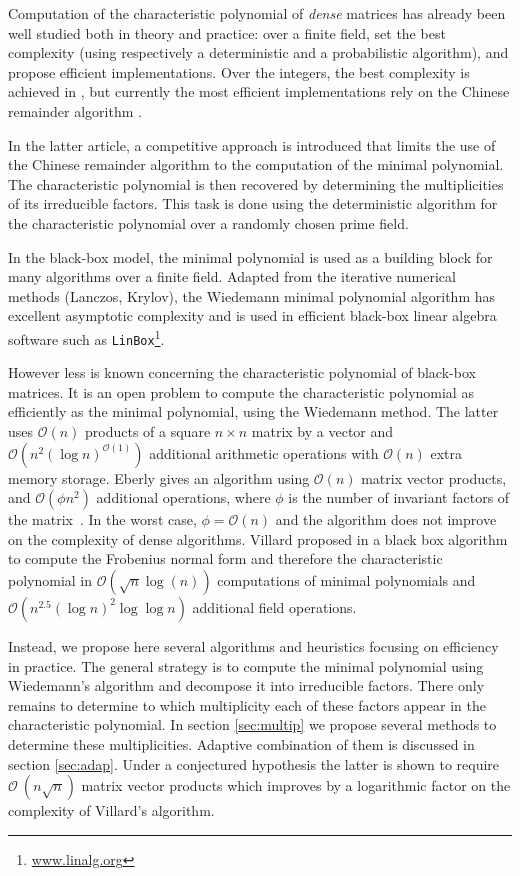 \documentclass{article}
\newcommand{\GO}{\mathcal{ O}}
\begin{document}
Computation of the characteristic polynomial of \textit{dense} matrices has already been well
studied both in theory and practice: over a finite field,
\cite{Keller-Gehrig:1985:charpoly,Pernet:2007:charp} set the best complexity
(using respectively a deterministic and a probabilistic algorithm), and 
\cite{jgd:2005:charp,Pernet:2007:charp} propose efficient implementations.
Over the integers, the best complexity is achieved in
\cite{Kaltofen:2005:CCDet}, but currently the  most efficient implementations 
rely on the Chinese remainder algorithm \cite{jgd:2005:charp}. 

In the latter article, a competitive approach is introduced that limits the use
of the Chinese remainder algorithm to the computation of the minimal polynomial.
The characteristic polynomial is then recovered by determining
the multiplicities of its irreducible factors. This task is done using the
deterministic algorithm for the characteristic polynomial over a randomly
chosen prime field.

In the black-box model, the minimal polynomial is used as a building block for
many algorithms over a finite field. Adapted from the iterative numerical
methods (Lanczos, Krylov), the Wiedemann minimal polynomial algorithm
\cite{Wiedemann:1986:SSLE,Kaltofen:1991:SSLS} has excellent asymptotic complexity
and is used in efficient black-box linear algebra software such as 
\texttt{LinBox}\footnote{\url{www.linalg.org}}.

However less is known concerning the characteristic
polynomial of black-box matrices. It is an open problem
\cite[Open Problem 3]{Kaltofen:1998:Open} to compute 
the characteristic polynomial as efficiently as the minimal polynomial, using
the Wiedemann method. The latter uses $\GO(n)$ products of a square $n\times n$
matrix by a vector and $\GO(n^2(\log n)^{\GO(1)})$ additional arithmetic
operations with $\GO(n)$ extra memory storage.
Eberly gives an algorithm  using $\GO(n)$ matrix vector products,
and $\GO(\phi n^2)$ additional operations, where $\phi$ is the number of
invariant factors of the matrix~\cite{Eberly:2000:BBFDOSF}. 
In the worst case, $\phi = \GO(n)$ and the
algorithm does not improve on the complexity of dense algorithms.
Villard proposed in \cite{Villard:2000:Frob} a black box
algorithm to compute the Frobenius normal form and therefore the characteristic
polynomial in $\GO(\sqrt{n}\log(n))$ computations of minimal polynomials 
and $\GO(n^{2.5} (\log n)^2 \log\log n)$ additional field operations. 

Instead, we propose here several algorithms and heuristics focusing on
efficiency in practice.
The general strategy is to compute the minimal
polynomial using  Wiedemann's algorithm and decompose it into irreducible factors.
There only remains to determine to which multiplicity each of
these factors appear in the characteristic polynomial. 
In section \ref{sec:multip} we propose
several methods to determine these multiplicities.
Adaptive combination of them is discussed in 
section \ref{sec:adap}. 
Under a conjectured hypothesis the latter is shown to
require  $\GO\ (n\sqrt{n})$ matrix vector products which improves by a logarithmic
factor on the complexity of Villard's algorithm.
\end{document}
